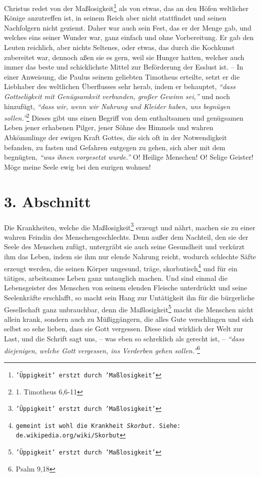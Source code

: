 \medskip

Christus redet von der Maßlosigkeit\footnote{\texttt{'Üppigkeit' erstzt durch
'Maßlosigkeit'}} als von
etwas, das an den Höfen weltlicher
Könige anzutreffen ist, in seinem Reich aber nicht stattfindet und seinen
Nachfolgern nicht geziemt. Daher war auch sein Fest, das er der Menge gab, und
welches eins seiner Wunder war, ganz einfach und ohne Vorbereitung. Er gab den
Leuten reichlich, aber nichts Seltenes, oder etwas, das durch die
Kochkunst
zubereitet war, dennoch aßen sie es gern, weil sie Hunger hatten, welcher auch
immer das beste und schicklichste Mittel zur Beförderung der Esslust ist. -- In
einer Anweisung, die Paulus seinem geliebten Timotheus erteilte, setzt er die
Liebhaber des weltlichen Überflusses sehr herab, indem er behauptet,
\textit{"`dass Gottseligkeit mit Genügsamkeit verbunden, großer Gewinn sei,"'}
und noch
hinzufügt, \textit{"`dass wir, wenn wir Nahrung und Kleider haben, uns begnügen
sollen."'}\footnote{1. Timotheus 6,6-11}
Dieses gibt uns einen Begriff von dem
enthaltsamen und genügsamen Leben jener erhabenen
Pilger, jener
Söhne des Himmels und wahren Abkömmlinge der
ewigen Kraft
Gottes, die sich oft in der
Notwendigkeit befanden, zu fasten und Gefahren entgegen zu gehen,
sich aber
mit dem begnügten, \textit{"`was ihnen vorgesetzt wurde."'} O! Heilige Menschen!
O!
Selige Geister! Möge meine Seele ewig bei den eurigen wohnen!

\section{3. Abschnitt} \label{kap14_ab3}

Die Krankheiten, welche die Maßlosigkeit\footnote{\texttt{'Üppigkeit' erstzt
durch 'Maßlosigkeit'}} erzeugt
und nährt, machen sie zu einer
wahren Feindin des Menschengeschlechts. Denn außer dem Nachteil, den sie der
Seele des Menschen zufügt, untergräbt sie auch seine
Gesundheit und verkürzt ihm
das Leben, indem sie ihm nur elende Nahrung reicht, wodurch schlechte Säfte
erzeugt werden, die seinen Körper ungesund, träge,
skorbutisch\footnote{\texttt{gemeint ist
wohl die Krankheit \textit{Skorbut}. Siehe: de.wikipedia.org/wiki/Skorbut}} und
für ein tätiges,
arbeitsames Leben ganz untauglich machen. Und sind
einmal die Lebensgeister des
Menschen von seinem elenden Fleische unterdrückt und seine Seelenkräfte
erschlafft, so macht sein Hang zur Untätigkeit ihn für die
bürgerliche Gesellschaft
 ganz unbrauchbar,
denn die Maßlosigkeit\footnote{\texttt{'Üppigkeit' erstzt durch 'Maßlosigkeit'}}
macht die Menschen nicht
allein krank, sondern auch zu Müßiggängern, die alles Gute
verschlingen und
sich selbst so sehe lieben, dass sie Gott vergessen. Diese sind wirklich der
Welt
zur Last, und die Schrift sagt uns, -- was eben so
schreklich
als gerecht ist,
-- \textit{"`dass diejenigen, welche Gott vergessen, ins Verderben gehen
sollen."'}\footnote{Psalm 9,18}

